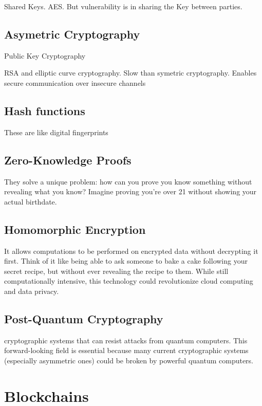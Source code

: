 \documentclass[
  letterpaper,
  DIV=11,
  numbers=noendperiod]{scrreprt}
\begin{document}
Shared Keys. AES. But vulnerability is in sharing the Key between
parties.

\section{Asymetric Cryptography}\label{asymetric-cryptography}

Public Key Cryptography

RSA and elliptic curve cryptography. Slow than symetric cryptography.
Enables secure communication over insecure channels

\section{Hash functions}\label{hash-functions}

These are like digital fingerprints

\section{Zero-Knowledge Proofs}\label{zero-knowledge-proofs}

They solve a unique problem: how can you prove you know something
without revealing what you know? Imagine proving you're over 21 without
showing your actual birthdate.

\section{Homomorphic Encryption}\label{homomorphic-encryption}

It allows computations to be performed on encrypted data without
decrypting it first. Think of it like being able to ask someone to bake
a cake following your secret recipe, but without ever revealing the
recipe to them. While still computationally intensive, this technology
could revolutionize cloud computing and data privacy.

\section{Post-Quantum Cryptography}\label{post-quantum-cryptography}

cryptographic systems that can resist attacks from quantum computers.
This forward-looking field is essential because many current
cryptographic systems (especially asymmetric ones) could be broken by
powerful quantum computers.

\chapter{Blockchains}\label{blockchains-1}
\end{document}
